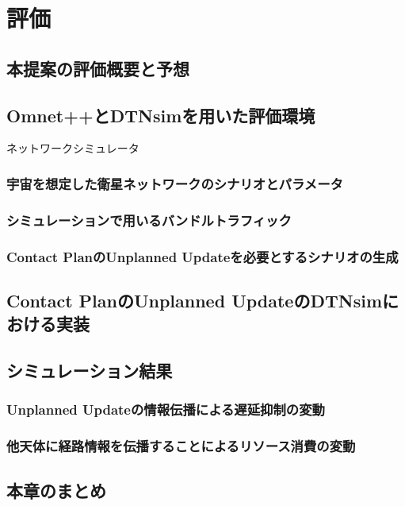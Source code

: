 \chapter{評価}
\label{chap:evaluation}
\section{本提案の評価概要と予想}

\section{Omnet++とDTNsimを用いた評価環境}
ネットワークシミュレータ
\subsection{宇宙を想定した衛星ネットワークのシナリオとパラメータ}
\subsection{シミュレーションで用いるバンドルトラフィック}

\subsection{Contact PlanのUnplanned Updateを必要とするシナリオの生成}

\section{Contact PlanのUnplanned UpdateのDTNsimにおける実装}


\section{シミュレーション結果}
\subsection{Unplanned Updateの情報伝播による遅延抑制の変動}


\subsection{他天体に経路情報を伝播することによるリソース消費の変動}

\section{本章のまとめ}